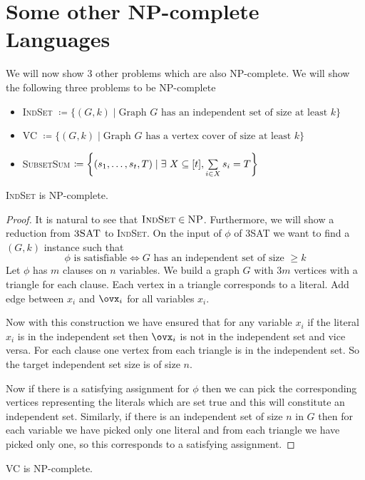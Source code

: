 \section{Some other \textsc{NP}-complete Languages}
We will now show 3 other problems which are also \textsc{NP}-complete. We will show the following three problems to be \textsc{NP}-complete\begin{itemize}
    \item \textsc{IndSet} $\coloneqq\{(G,k)\mid \text{Graph }G\text{ has an independent set of size at least $k$}\}$
    \item \textsc{VC} $\coloneqq\{(G,k)\mid \text{Graph }G\text{ has a vertex cover of size at least $k$}\}$
    \item \textsc{SubsetSum} $\coloneqq\lt\{(s_1,\dots, s_t, T)\mid \exs\ X\subseteq [t], \sum\limits_{i\in X}s_i=T\rt\}$
\end{itemize}
\begin{Theorem}{}{}
\textsc{IndSet} is \textsc{NP}-complete.
\end{Theorem}
\begin{proof}
    It is natural to see that $\textsc{IndSet}\in\textsc{NP}$. Furthermore, we will show a reduction from $\textsc{3SAT}$ to \textsc{IndSet}. On the input of $\phi$ of \textsc{3SAT} we want to find a $(G,k)$ instance such that $$\phi\text{ is satisfiable}\iff G\text{ has an independent set of size $\geq k$}$$Let $\phi$ has $m$ clauses on $n$ variables. We build a graph $G$ with $3m$ vertices with a triangle for each clause. Each vertex in a triangle corresponds to a literal. Add edge between $x_i$ and $\ovx_i$ for all variables $x_i$. 

    Now with this construction we have ensured that for any variable $x_i$ if the literal $x_i$ is in the independent set then $\ovx_i$ is not in the independent set and vice versa. For each clause one vertex from each triangle is in the independent set. So the target independent set size is of size $n$. 

    Now if there is a satisfying assignment for $\phi$ then we can pick the corresponding vertices representing the literals which are set true and this will constitute an independent set. Similarly, if there is an independent set of size $n$ in $G$ then for each variable we have picked only one literal and from each triangle we have picked only one, so this corresponds to a satisfying assignment.
\end{proof}
\begin{Theorem}{}{}
\textsc{VC} is \textsc{NP}-complete.
\end{Theorem}
